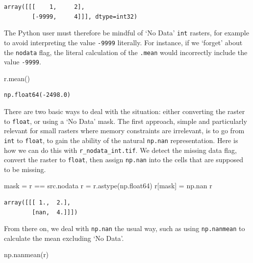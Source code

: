 \documentclass[
  letterpaper,
]{krantz}
\newenvironment{Shaded}{\begin{snugshade}}{\end{snugshade}}
\newcommand{\NormalTok}[1]{\textcolor[rgb]{0.00,0.23,0.31}{#1}}
\newcommand{\OperatorTok}[1]{\textcolor[rgb]{0.37,0.37,0.37}{#1}}
\begin{document}
\begin{verbatim}
array([[[    1,     2],
        [-9999,     4]]], dtype=int32)
\end{verbatim}

The Python user must therefore be mindful of `No Data' \texttt{int}
rasters, for example to avoid interpreting the value \texttt{-9999}
literally. For instance, if we `forget' about the \texttt{nodata} flag,
the literal calculation of the \texttt{.mean} would incorrectly include
the value \texttt{-9999}.

\begin{Shaded}
\begin{Highlighting}[]
\NormalTok{r.mean()}
\end{Highlighting}
\end{Shaded}

\begin{verbatim}
np.float64(-2498.0)
\end{verbatim}

There are two basic ways to deal with the situation: either converting
the raster to \texttt{float}, or using a `No Data' mask. The first
approach, simple and particularly relevant for small rasters where
memory constraints are irrelevant, is to go from \texttt{int} to
\texttt{float}, to gain the ability of the natural \texttt{np.nan}
representation. Here is how we can do this with
\texttt{r\_nodata\_int.tif}. We detect the missing data flag, convert
the raster to \texttt{float}, then assign \texttt{np.nan} into the cells
that are supposed to be missing.

\begin{Shaded}
\begin{Highlighting}[]
\NormalTok{mask }\OperatorTok{=}\NormalTok{ r }\OperatorTok{==}\NormalTok{ src.nodata}
\NormalTok{r }\OperatorTok{=}\NormalTok{ r.astype(np.float64)}
\NormalTok{r[mask] }\OperatorTok{=}\NormalTok{ np.nan}
\NormalTok{r}
\end{Highlighting}
\end{Shaded}

\begin{verbatim}
array([[[ 1.,  2.],
        [nan,  4.]]])
\end{verbatim}

From there on, we deal with \texttt{np.nan} the usual way, such as using
\texttt{np.nanmean} to calculate the mean excluding `No Data'.

\begin{Shaded}
\begin{Highlighting}[]
\NormalTok{np.nanmean(r)}
\end{Highlighting}
\end{Shaded}
\end{document}
